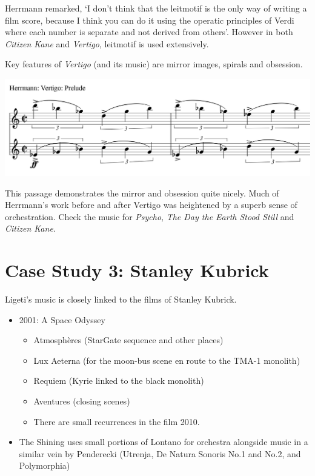 \begin{itemize}
Herrmann remarked, `I don't think that the leitmotif is the only way of writing a film score, because I think you can do it using the operatic principles of Verdi where each number is separate and not derived from others'. However in both \textit{Citizen Kane} and \textit{Vertigo}, leitmotif is used extensively. 

Key features of \textit{Vertigo} (and its music) are mirror images, spirals and obsession. 

\includegraphics[scale=0.8]{herrmann-prelude}

This passage demonstrates the mirror and obsession quite nicely. Much of Herrmann's work before and after Vertigo was heightened by a superb sense of orchestration. Check the music for \textit{Psycho}, \textit{The Day the Earth Stood Still} and \textit{Citizen Kane}. 
\end{itemize}




\section{Case Study 3: Stanley Kubrick}
Ligeti's music is closely linked to the films of Stanley Kubrick. 
\begin{itemize}
\item 2001: A Space Odyssey
\begin{itemize}
\item Atmosphères (StarGate sequence and other places) 
\item Lux Aeterna (for the moon-bus scene en route to the TMA-1 monolith)
\item Requiem (Kyrie linked to the black monolith)
\item Aventures (closing scenes)
\item There are small recurrences in the film 2010.
\end{itemize}
\item The Shining uses small portions of Lontano for orchestra alongside music in a similar vein by Penderecki (Utrenja, De Natura Sonoris No.1 and No.2, and Polymorphia)
\end{itemize}


